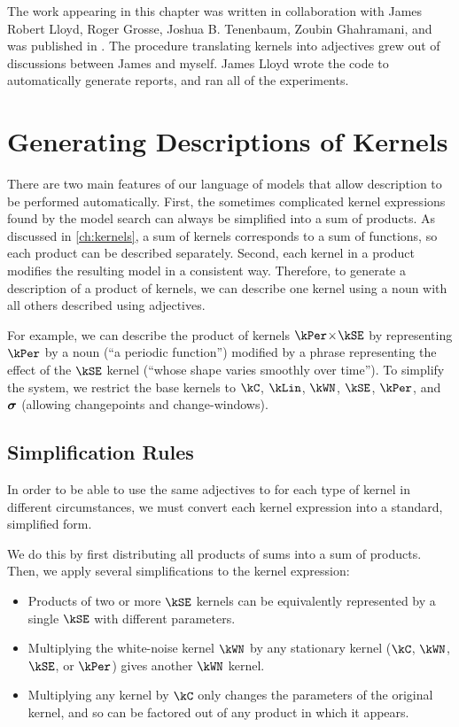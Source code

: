 The work appearing in this chapter was written in collaboration with James Robert Lloyd, Roger Grosse, Joshua B. Tenenbaum, Zoubin Ghahramani, and was published in \citep{LloDuvGroetal14}.
The procedure translating kernels into adjectives grew out of discussions between James and myself.
James Lloyd wrote the code to automatically generate reports, and ran all of the experiments.


\section{Generating Descriptions of Kernels}

There are two main features of our language of \gp{} models that allow description to be performed automatically.
First, the sometimes complicated kernel expressions found by the model search can always be simplified into a sum of products.
As discussed in \cref{ch:kernels}, a sum of kernels corresponds to a sum of functions, so each product can be described separately.
Second, each kernel in a product modifies the resulting model in a consistent way.
Therefore, to generate a description of a product of kernels, we can describe one kernel using a noun with all others described using adjectives.

For example, we can describe the product of kernels $\kPer \kerntimes \kSE$ by representing $\kPer$ by a noun (``a periodic function'') modified by a phrase representing the effect of the $\kSE$ kernel (``whose shape varies smoothly over time'').
To simplify the system, we restrict the base kernels to $\kC$, $\kLin$, $\kWN$, $\kSE$, $\kPer$, and $\boldsymbol{\sigma}$ (allowing changepoints and change-windows).


\subsection{Simplification Rules}

In order to be able to use the same adjectives to for each type of kernel in different circumstances, we must convert each kernel expression into a standard, simplified form.

We do this by first distributing all products of sums into a sum of products.
Then, we apply several simplifications to the kernel expression:

\begin{itemize}
\item Products of two or more $\kSE$ kernels can be equivalently represented by a single $\kSE$ with different parameters.
\item Multiplying the white-noise kernel $\kWN$ by any stationary kernel ($\kC$, $\kWN$, $\kSE$, or $\kPer$) gives another $\kWN$ kernel.
\item Multiplying any kernel by $\kC$ only changes the parameters of the original kernel, and so can be factored out of any product in which it appears.
\end{itemize}

